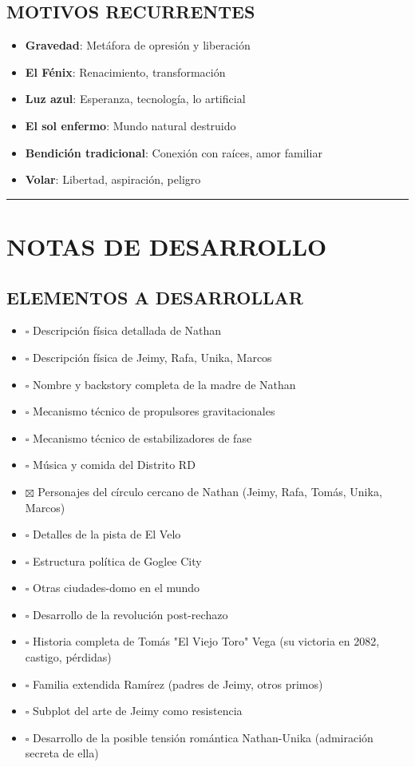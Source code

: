 \documentclass[11pt,a4paper]{report}
\begin{document}
\subsection{MOTIVOS RECURRENTES}

\begin{itemize}
  \item \textbf{Gravedad}: Metáfora de opresión y liberación
  \item \textbf{El Fénix}: Renacimiento, transformación
  \item \textbf{Luz azul}: Esperanza, tecnología, lo artificial
  \item \textbf{El sol enfermo}: Mundo natural destruido
  \item \textbf{Bendición tradicional}: Conexión con raíces, amor familiar
  \item \textbf{Volar}: Libertad, aspiración, peligro

\end{itemize}
\bigskip\hrule\bigskip

\section{NOTAS DE DESARROLLO}

\subsection{ELEMENTOS A DESARROLLAR}

\begin{itemize}
  \item $\square$ Descripción física detallada de Nathan
  \item $\square$ Descripción física de Jeimy, Rafa, Unika, Marcos
  \item $\square$ Nombre y backstory completa de la madre de Nathan
  \item $\square$ Mecanismo técnico de propulsores gravitacionales
  \item $\square$ Mecanismo técnico de estabilizadores de fase
  \item $\square$ Música y comida del Distrito RD
  \item $\boxtimes$ Personajes del círculo cercano de Nathan (Jeimy, Rafa, Tomás, Unika, Marcos)
  \item $\square$ Detalles de la pista de El Velo
  \item $\square$ Estructura política de Goglee City
  \item $\square$ Otras ciudades-domo en el mundo
  \item $\square$ Desarrollo de la revolución post-rechazo
  \item $\square$ Historia completa de Tomás "El Viejo Toro" Vega (su victoria en 2082, castigo, pérdidas)
  \item $\square$ Familia extendida Ramírez (padres de Jeimy, otros primos)
  \item $\square$ Subplot del arte de Jeimy como resistencia
  \item $\square$ Desarrollo de la posible tensión romántica Nathan-Unika (admiración secreta de ella)

\end{itemize}
\end{document}
